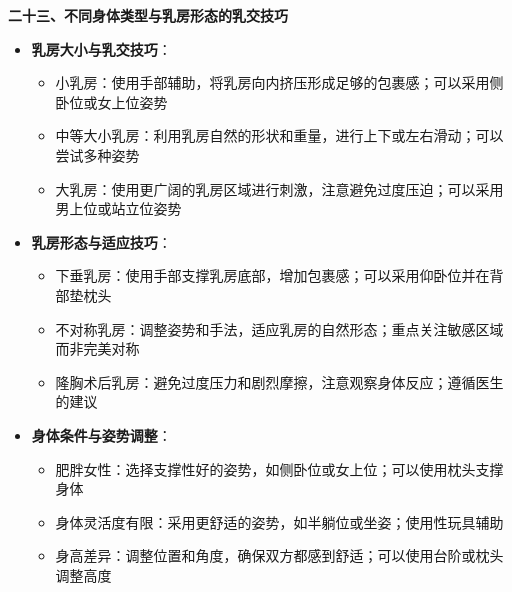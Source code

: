 \documentclass[12pt,UTF8]{ctexbook}
\begin{document}
  \textbf{二十三、不同身体类型与乳房形态的乳交技巧}
  \begin{itemize}
  \item \textbf{乳房大小与乳交技巧}：
    \begin{itemize}
    \item 小乳房：使用手部辅助，将乳房向内挤压形成足够的包裹感；可以采用侧卧位或女上位姿势
    \item 中等大小乳房：利用乳房自然的形状和重量，进行上下或左右滑动；可以尝试多种姿势
    \item 大乳房：使用更广阔的乳房区域进行刺激，注意避免过度压迫；可以采用男上位或站立位姿势
    \end{itemize}
  \item \textbf{乳房形态与适应技巧}：
    \begin{itemize}
    \item 下垂乳房：使用手部支撑乳房底部，增加包裹感；可以采用仰卧位并在背部垫枕头
    \item 不对称乳房：调整姿势和手法，适应乳房的自然形态；重点关注敏感区域而非完美对称
    \item 隆胸术后乳房：避免过度压力和剧烈摩擦，注意观察身体反应；遵循医生的建议
    \end{itemize}
  \item \textbf{身体条件与姿势调整}：
    \begin{itemize}
    \item 肥胖女性：选择支撑性好的姿势，如侧卧位或女上位；可以使用枕头支撑身体
    \item 身体灵活度有限：采用更舒适的姿势，如半躺位或坐姿；使用性玩具辅助
    \item 身高差异：调整位置和角度，确保双方都感到舒适；可以使用台阶或枕头调整高度
    \end{itemize}
  \end{itemize}
\end{document}
